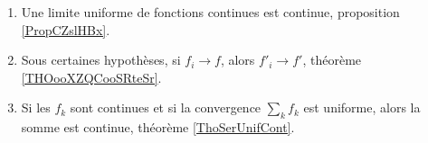 
\begin{enumerate}
	\item
	      Une limite uniforme de fonctions continues est continue, proposition \ref{PropCZslHBx}.
	\item
	      Sous certaines hypothèses, si \( f_i\to f\), alors \( f'_i\to f'\), théorème \ref{THOooXZQCooSRteSr}.
	\item
	      Si les \( f_k\) sont continues et si la convergence \( \sum_kf_k\) est uniforme, alors la somme est continue, théorème \ref{ThoSerUnifCont}.
\end{enumerate}
